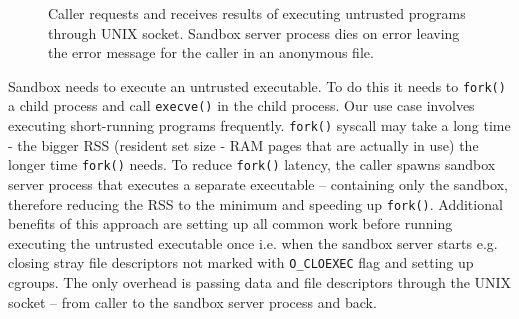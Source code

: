 \documentclass[licencjacka,en]{pracamgr}
\begin{document}
\begin{figure}[h]
\tikzset{>=latex} %
\centering
{}
\caption{Caller requests and receives results of executing untrusted programs through UNIX socket. Sandbox server process dies on error leaving the error message for the caller in an anonymous file.}
\label{fig:caller_to_sandbox_server_communication}
\end{figure}

Sandbox needs to execute an untrusted executable. To do this it needs to \texttt{fork()} a child process and call \texttt{execve()} in the child process. Our use case involves executing short-running programs frequently. \texttt{fork()} syscall may take a long time \cite{redis-latency-generated-by-fork} - the bigger RSS (resident set size - RAM pages that are actually in use) the longer time \texttt{fork()} needs. To reduce \texttt{fork()} latency, the caller spawns sandbox server process that executes a separate executable -- containing only the sandbox, therefore reducing the RSS to the minimum and speeding up \texttt{fork()}. Additional benefits of this approach are setting up all common work before running executing the untrusted executable once i.e. when the sandbox server starts e.g. closing stray file descriptors not marked with \texttt{O\_CLOEXEC} flag and setting up cgroups. The only overhead is passing data and file descriptors through the UNIX socket -- from caller to the sandbox server process and back.

\printbibliography
\end{document}
